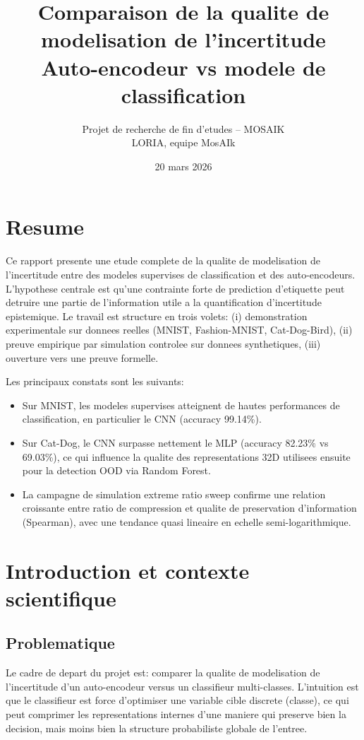 \documentclass[11pt,a4paper]{article}
\title{Comparaison de la qualite de modelisation de l'incertitude\\
\large Auto-encodeur vs modele de classification}
\author{Projet de recherche de fin d'etudes -- MOSAIK\\
LORIA, equipe MosAIk}
\date{20 mars 2026}
\begin{document}
\maketitle
\tableofcontents
\newpage

\section{Resume}
Ce rapport presente une etude complete de la qualite de modelisation de l'incertitude entre des modeles supervises de classification et des auto-encodeurs. L'hypothese centrale est qu'une contrainte forte de prediction d'etiquette peut detruire une partie de l'information utile a la quantification d'incertitude epistemique. Le travail est structure en trois volets: (i) demonstration experimentale sur donnees reelles (MNIST, Fashion-MNIST, Cat-Dog-Bird), (ii) preuve empirique par simulation controlee sur donnees synthetiques, (iii) ouverture vers une preuve formelle.

Les principaux constats sont les suivants:
\begin{itemize}[leftmargin=1.2cm]
    \item Sur MNIST, les modeles supervises atteignent de hautes performances de classification, en particulier le CNN (accuracy 99.14\%).
    \item Sur Cat-Dog, le CNN surpasse nettement le MLP (accuracy 82.23\% vs 69.03\%), ce qui influence la qualite des representations 32D utilisees ensuite pour la detection OOD via Random Forest.
    \item La campagne de simulation extreme ratio sweep confirme une relation croissante entre ratio de compression et qualite de preservation d'information (Spearman), avec une tendance quasi lineaire en echelle semi-logarithmique.
\end{itemize}

\section{Introduction et contexte scientifique}
\subsection{Problematique}
Le cadre de depart du projet est: comparer la qualite de modelisation de l'incertitude d'un auto-encodeur versus un classifieur multi-classes. L'intuition est que le classifieur est force d'optimiser une variable cible discrete (classe), ce qui peut comprimer les representations internes d'une maniere qui preserve bien la decision, mais moins bien la structure probabiliste globale de l'entree.
\end{document}
